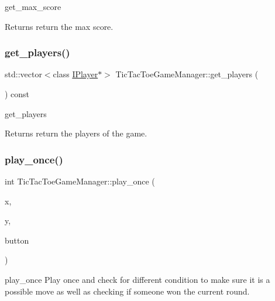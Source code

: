 get\+\_\+max\+\_\+score 

\begin{DoxyReturn}{Returns}
return the max score. 
\end{DoxyReturn}
\mbox{\label{class_tic_tac_toe_game_manager_ac7a54acc425dd27e92f8ff3866a333a6}} 
\subsubsection{\texorpdfstring{get\+\_\+players()}{get\_players()}}
{\footnotesize\ttfamily std\+::vector$<$class \hyperlink{class_i_player}{I\+Player}$\ast$$>$ Tic\+Tac\+Toe\+Game\+Manager\+::get\+\_\+players (\begin{DoxyParamCaption}{ }\end{DoxyParamCaption}) const\hspace{0.3cm}{\ttfamily [inline]}}



get\+\_\+players 

\begin{DoxyReturn}{Returns}
return the players of the game. 
\end{DoxyReturn}
\mbox{\label{class_tic_tac_toe_game_manager_af276b6b66af26c170801bdd7aa1fd2f6}} 
\subsubsection{\texorpdfstring{play\+\_\+once()}{play\_once()}}
{\footnotesize\ttfamily int Tic\+Tac\+Toe\+Game\+Manager\+::play\+\_\+once (\begin{DoxyParamCaption}\item[{int}]{x,  }\item[{int}]{y,  }\item[{class Q\+Push\+Button $\ast$}]{button }\end{DoxyParamCaption})}



play\+\_\+once Play once and check for different condition to make sure it is a possible move as well as checking if someone won the current round. 


